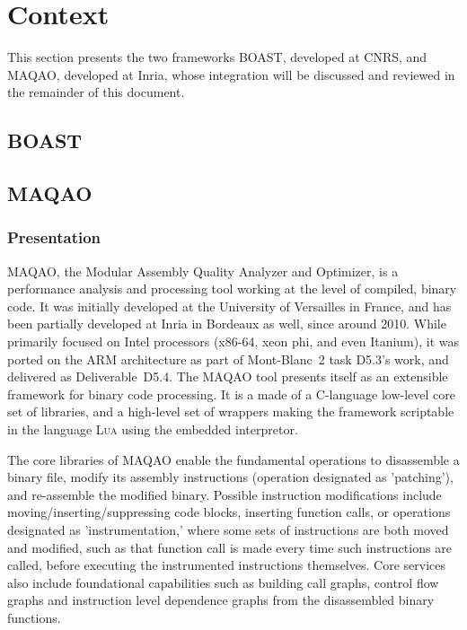 \documentclass[11pt, a4paper, twoside]{montblanc2}
\def\lua{\textsc{Lua}\xspace}
\begin{document}
\section{Context}\label{sec:context}

This section presents the two frameworks BOAST, developed at CNRS, and MAQAO, 
developed at Inria, whose integration will be discussed and reviewed in the 
remainder of this document.

\subsection{BOAST}



\subsection{MAQAO}

\subsubsection{Presentation}
MAQAO, the Modular Assembly Quality Analyzer and Optimizer, is a performance analysis and processing 
tool working at the level of compiled, binary code. It was initially developed at the University of 
Versailles in France, and has been partially developed at Inria in Bordeaux as well, since around 
2010. While primarily focused on Intel processors (x86-64, xeon phi, and even Itanium), it was 
ported on the ARM architecture as part of Mont-Blanc~2 task D5.3's work, and delivered as 
Deliverable~D5.4. The MAQAO tool presents itself as an extensible framework for binary code 
processing. It is a made of a C-language low-level core set of libraries, and a high-level set of 
wrappers making the framework scriptable in the language \lua using the embedded interpretor. 

The core libraries of MAQAO enable the fundamental operations to disassemble a binary file, modify 
its assembly instructions (operation designated as 'patching'), and re-assemble the modified binary. 
Possible instruction modifications include moving/inserting/suppressing code blocks, inserting 
function calls, or operations designated as 'instrumentation,' where some sets of instructions are 
both moved and modified, such as that function call is made every time such instructions are called, 
before executing the instrumented instructions themselves. Core services also include foundational 
capabilities such as building call graphs, control flow graphs and instruction 
level dependence graphs from the disassembled binary functions.
\end{document}
